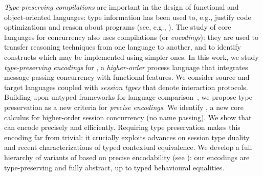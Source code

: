 

\emph{Type-preserving compilations} are important in the design of 
functional and object-oriented languages: type information has been
used to, e.g., justify code optimizations and reason about programs (see, e.g., \cite{DBLP:journals/toplas/MorrisettWCG99,DBLP:conf/pldi/ShaoA95,DBLP:journals/toplas/LeagueST02}). 
The study of core languages for concurrency also uses compilations (or \emph{encodings}):
they are used to transfer reasoning techniques 
from one language to another, and to identify constructs which may be implemented
using simpler ones. 
In this work, we study \emph{type-preserving encodings} for \HOp, a \emph{higher-order} 
process language that integrates message-passing concurrency with functional features.
We consider source and target  languages coupled with \emph{session types} that denote interaction protocols. 
Building upon untyped frameworks for language comparison~\cite{DBLP:journals/iandc/Gorla10}, 
we propose type preservation as a {new criteria} for \emph{precise encodings}.
We identify \HO, a new core calculus for higher-order session concurrency (no
name passing). 
We show that \HO can encode \HOp precisely and efficiently. 
Requiring  
type preservation makes
this encoding far from trivial: it crucially exploits  advances on session type duality and recent
 characterizations of typed contextual equivalence.
We develop a full hierarchy of variants of \HOp based on 
precise encodability (see ):
our encodings are
type-preserving and fully abstract, up to typed
behavioural equalities. 

